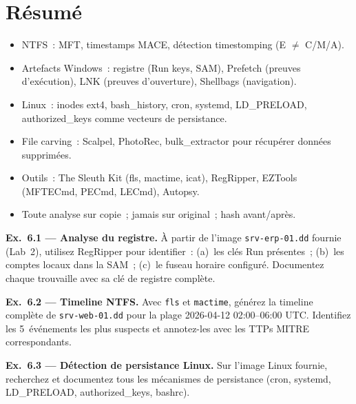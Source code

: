 \section*{Résumé}

\begin{boxresume}
\begin{itemize}
  \item NTFS~: MFT, timestamps MACE, détection timestomping (E $\neq$ C/M/A).
  \item Artefacts Windows~: registre (Run keys, SAM), Prefetch (preuves
        d'exécution), LNK (preuves d'ouverture), Shellbags (navigation).
  \item Linux~: inodes ext4, bash\_history, cron, systemd, LD\_PRELOAD,
        authorized\_keys comme vecteurs de persistance.
  \item File carving~: Scalpel, PhotoRec, bulk\_extractor pour récupérer
        données supprimées.
  \item Outils~: The Sleuth Kit (fls, mactime, icat), RegRipper, EZTools
        (MFTECmd, PECmd, LECmd), Autopsy.
  \item Toute analyse sur copie~; jamais sur original~; hash avant/après.
\end{itemize}
\end{boxresume}

\begin{boxexo}
\textbf{Ex.~6.1 — Analyse du registre.}
À partir de l'image \texttt{srv-erp-01.dd} fournie (Lab~2), utilisez
RegRipper pour identifier~: (a)~les clés Run présentes~;
(b)~les comptes locaux dans la SAM~; (c)~le fuseau horaire configuré.
Documentez chaque trouvaille avec sa clé de registre complète.

\medskip\textbf{Ex.~6.2 — Timeline NTFS.}
Avec \texttt{fls} et \texttt{mactime}, générez la timeline complète
de \texttt{srv-web-01.dd} pour la plage 2026-04-12 02:00--06:00 UTC.
Identifiez les 5~événements les plus suspects et annotez-les avec
les TTPs MITRE correspondants.

\medskip\textbf{Ex.~6.3 — Détection de persistance Linux.}
Sur l'image Linux fournie, recherchez et documentez tous les mécanismes
de persistance (cron, systemd, LD\_PRELOAD, authorized\_keys, bashrc).
\end{boxexo}
